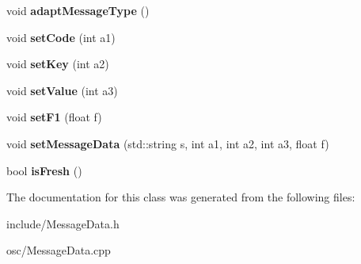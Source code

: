 \begin{DoxyCompactItemize}
\item 
void {\bfseries adapt\+Message\+Type} ()\hypertarget{classosc_1_1MessageData_a0f8ce5f6d5c4452e26656236ee7aefc3}{}\label{classosc_1_1MessageData_a0f8ce5f6d5c4452e26656236ee7aefc3}

\item 
void {\bfseries set\+Code} (int a1)\hypertarget{classosc_1_1MessageData_a8639583a844208ccae9568bb68d1e547}{}\label{classosc_1_1MessageData_a8639583a844208ccae9568bb68d1e547}

\item 
void {\bfseries set\+Key} (int a2)\hypertarget{classosc_1_1MessageData_a54a0ddfb44fba671ba243914b037e231}{}\label{classosc_1_1MessageData_a54a0ddfb44fba671ba243914b037e231}

\item 
void {\bfseries set\+Value} (int a3)\hypertarget{classosc_1_1MessageData_a24e273f0a4443505ccf6222405cfb567}{}\label{classosc_1_1MessageData_a24e273f0a4443505ccf6222405cfb567}

\item 
void {\bfseries set\+F1} (float f)\hypertarget{classosc_1_1MessageData_a94dce06ace95a93c075dbaf253e559fe}{}\label{classosc_1_1MessageData_a94dce06ace95a93c075dbaf253e559fe}

\item 
void {\bfseries set\+Message\+Data} (std\+::string s, int a1, int a2, int a3, float f)\hypertarget{classosc_1_1MessageData_a9eb7741e4216075b0e03c554d83e35ae}{}\label{classosc_1_1MessageData_a9eb7741e4216075b0e03c554d83e35ae}

\item 
bool {\bfseries is\+Fresh} ()\hypertarget{classosc_1_1MessageData_a169f4e7ec5a0eb896cfccd8186b5fe8d}{}\label{classosc_1_1MessageData_a169f4e7ec5a0eb896cfccd8186b5fe8d}

\end{DoxyCompactItemize}


The documentation for this class was generated from the following files\+:\begin{DoxyCompactItemize}
\item 
include/Message\+Data.\+h\item 
osc/Message\+Data.\+cpp\end{DoxyCompactItemize}
